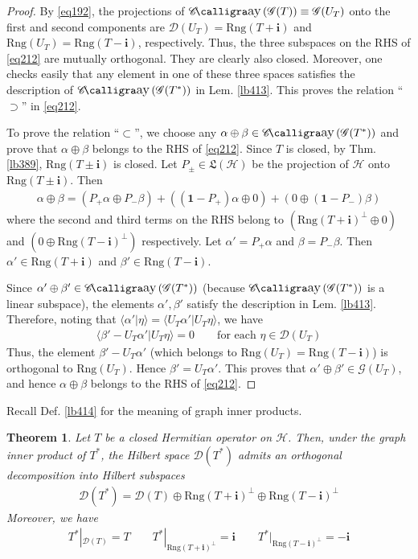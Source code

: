 \documentclass[12pt,b5paper,notitlepage]{article}
\theoremstyle{definition}
\theoremstyle{plain}
\newtheorem{thm}[df]{Theorem}
\DeclareMathOperator{\Cay}{\mathscr{C}\text{\kern -3pt {\calligra\large ay}}\,}
\newcommand{\fk}{\mathfrak}
\newcommand{\idt}{\mathbf{1}}
\newcommand{\Dom}{\mathscr{D}}
\newcommand{\bk}[1]{\langle {#1}\rangle}
\newcommand{\im}{\mathbf{i}}
\newcommand{\Rng}{\mathrm{Rng}}
\newcommand{\MH}{\mathcal H}
\newcommand{\SG}{\mathscr G}
\numberwithin{equation}{section}
\begin{document}
\begin{proof}
By \eqref{eq192}, the projections of $\Cay(\SG(T))\equiv\SG(U_T)$ onto the first and second components are $\Dom(U_T)=\Rng(T+\im)$ and $\Rng(U_T)=\Rng(T-\im)$, respectively. Thus, the three subspaces on the RHS of \eqref{eq212} are mutually orthogonal. They are clearly also closed. Moreover, one checks easily that any element in one of these three spaces satisfies the description of $\Cay(\SG(T^*))$ in Lem. \ref{lb413}. This proves the relation ``$\supset$'' in \eqref{eq212}.

To prove the relation ``$\subset$'', we choose any $\alpha\oplus\beta\in\Cay(\SG(T^*))$ and prove that $\alpha\oplus\beta$ belongs to the RHS of \eqref{eq212}. Since $T$ is closed, by Thm. \ref{lb389}, $\Rng(T\pm\im)$ is closed. Let $P_\pm\in\fk L(\MH)$ be the projection of $\MH$ onto $\Rng(T\pm\im)$. Then
\begin{align*}
\alpha\oplus\beta=(P_+\alpha\oplus P_-\beta)+((\idt-P_+)\alpha\oplus0)+(0\oplus (\idt-P_-)\beta)
\end{align*}
where the second and third terms on the RHS belong to $(\Rng(T+\im)^\perp\oplus 0)$ and $(0\oplus\Rng(T-\im)^\perp)$ respectively. Let $\alpha'=P_+\alpha$ and $\beta=P_-\beta$. Then $\alpha'\in\Rng(T+\im)$ and $\beta'\in\Rng(T-\im)$.

Since $\alpha'\oplus\beta'\in\Cay(\SG(T^*))$ (because $\Cay(\SG(T^*))$ is a linear subspace), the elements $\alpha',\beta'$ satisfy the description in Lem. \ref{lb413}. Therefore, noting that $\bk{\alpha'|\eta}=\bk{U_T\alpha'|U_T\eta}$, we have
\begin{align*}
\bk{\beta'-U_T\alpha'|U_T\eta}=0\qquad\text{for each }\eta\in\Dom(U_T)
\end{align*}
Thus, the element $\beta'-U_T\alpha'$ (which belongs to $\Rng(U_T)=\Rng(T-\im)$) is orthogonal to $\Rng(U_T)$. Hence $\beta'=U_T\alpha'$. This proves that $\alpha'\oplus\beta'\in\SG(U_T)$, and hence $\alpha\oplus\beta$ belongs to the RHS of \eqref{eq212}.
\end{proof}


Recall Def. \ref{lb414} for the meaning of graph inner products.

\begin{thm}\label{lb415}
Let $T$ be a closed Hermitian operator on $\MH$. Then, under the graph inner product of $T^*$, the Hilbert space $\Dom(T^*)$ admits an orthogonal decomposition into Hilbert subspaces
\begin{align}\label{eq215}
\Dom(T^*)=\Dom(T)\oplus \Rng(T+\im)^\perp\oplus\Rng(T-\im)^\perp
\end{align}
Moreover, we have
\begin{gather}\label{eq216}
T^*|_{\Dom(T)}=T\qquad T^*|_{\Rng(T+\im)^\perp}=\im\qquad T^*|_{\Rng(T-\im)^\perp}=-\im
\end{gather}
\end{thm}
\end{document}
